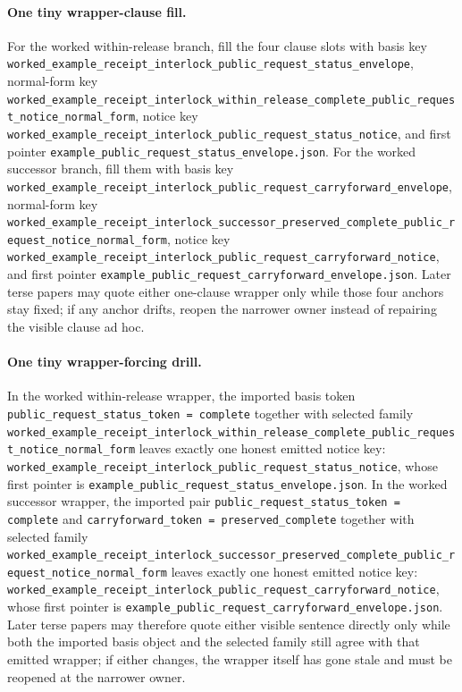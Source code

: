\documentclass[11pt]{article}
\begin{document}
\paragraph{One tiny wrapper-clause fill.}
For the worked within-release branch, fill the four clause slots with basis key \nolinkurl{worked_example_receipt_interlock_public_request_status_envelope}, normal-form key \nolinkurl{worked_example_receipt_interlock_within_release_complete_public_request_notice_normal_form}, notice key \nolinkurl{worked_example_receipt_interlock_public_request_status_notice}, and first pointer \nolinkurl{example_public_request_status_envelope.json}. For the worked successor branch, fill them with basis key \nolinkurl{worked_example_receipt_interlock_public_request_carryforward_envelope}, normal-form key \nolinkurl{worked_example_receipt_interlock_successor_preserved_complete_public_request_notice_normal_form}, notice key \nolinkurl{worked_example_receipt_interlock_public_request_carryforward_notice}, and first pointer \nolinkurl{example_public_request_carryforward_envelope.json}. Later terse papers may quote either one-clause wrapper only while those four anchors stay fixed; if any anchor drifts, reopen the narrower owner instead of repairing the visible clause ad hoc.\cite{series:workedexample}

\paragraph{One tiny wrapper-forcing drill.}
In the worked within-release wrapper, the imported basis token \texttt{public\_request\_status\_token = complete} together with selected family \nolinkurl{worked_example_receipt_interlock_within_release_complete_public_request_notice_normal_form} leaves exactly one honest emitted notice key: \nolinkurl{worked_example_receipt_interlock_public_request_status_notice}, whose first pointer is \nolinkurl{example_public_request_status_envelope.json}. In the worked successor wrapper, the imported pair \texttt{public\_request\_status\_token = complete} and \texttt{carryforward\_token = preserved\_complete} together with selected family \nolinkurl{worked_example_receipt_interlock_successor_preserved_complete_public_request_notice_normal_form} leaves exactly one honest emitted notice key: \nolinkurl{worked_example_receipt_interlock_public_request_carryforward_notice}, whose first pointer is \nolinkurl{example_public_request_carryforward_envelope.json}. Later terse papers may therefore quote either visible sentence directly only while both the imported basis object and the selected family still agree with that emitted wrapper; if either changes, the wrapper itself has gone stale and must be reopened at the narrower owner.\cite{series:workedexample}
\end{document}
